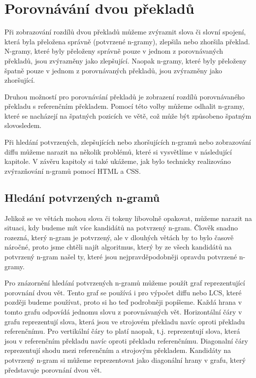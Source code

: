 \chapter{Porovnávání dvou překladů}
\label{chap:compare}

Při zobrazování rozdílů dvou překladů můžeme zvýraznit slova či slovní spojení,
  která byla přeložena správně (potvrzené n-gramy),
  zlepšila nebo zhoršila překlad.
N-gramy, které byly přeloženy správně pouze v jednom z porovnávaných překladů,
  jsou zvýrazněny jako zlepšující.
Naopak n-gramy, které byly přeloženy špatně pouze v jednom z porovnávaných překladů,
  jsou zvýrazněny jako zhoršující. 

Druhou možností pro porovnávání překladů je zobrazení rozdílů porovnávaného překladu s referenčním překladem.
Pomocí této volby můžeme odhalit n-gramy,
  které se nacházejí na špatných pozicích ve větě,
  což může být způsobeno špatným slovosledem.

Při hledání potvrzených, zlepšujících nebo zhoršujících n-gramů nebo zobrazování diffu můžeme narazit na několik problémů,
  které si vysvětlíme v následující kapitole.
V závěru kapitoly si také ukážeme,
  jak bylo technicky realizováno zvýrazňování n-gramů pomocí HTML a CSS.

\section{Hledání potvrzených n-gramů}
Jelikož se ve větách mohou slova či tokeny libovolně opakovat,
  můžeme narazit na situaci,
  kdy budeme mít více kandidátů na potvrzený n-gram.
Člověk snadno rozezná,
  který n-gram je potvrzený,
  ale v dlouhých větách by to bylo časově náročné,
  proto jsme chtěli najít algoritmus,
  který by ze všech kandidátů na potvrzený n-gram našel ty,
  které jsou nejpravděpodobněji opravdu potvrzené n-gramy.

Pro znázornění hledání potvrzených n-gramů můžeme použít graf reprezentující porovnání dvou vět.
Tento graf se používá i pro výpočet diffu nebo LCS,
  které později budeme používat,
  proto si ho teď podrobněji popíšeme.
Každá hrana v tomto grafu odpovídá jednomu slovu z porovnávaných vět.
Horizontální čáry v grafu reprezentují slova, která jsou ve strojovém překladu navíc oproti překladu referenčnímu. 
Pro vertikální čáry to platí naopak, t.j. reprezentují slova, která jsou v referenčním překladu navíc oproti překladu referenčnímu.
Diagonalní čáry reprezentují shodu mezi referenčním a strojovým překladem.
Kandidáty na potvrzený n-gram si můžeme reprezentovat jako diagonální hrany v grafu,
  který představuje porovnání dvou vět.

